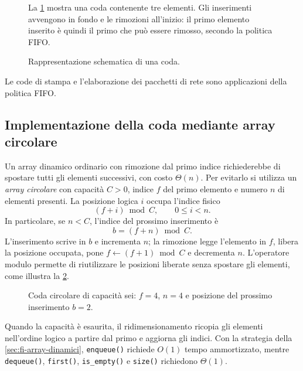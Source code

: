 \begin{figure}[htbp]
  \begin{minipage}[c]{0.54\textwidth}
    La \cref{fig:fi-coda} mostra una coda contenente tre elementi.
    Gli inserimenti avvengono in fondo e le rimozioni all'inizio:
    il primo elemento inserito è quindi il primo che può essere
    rimosso, secondo la politica FIFO.
  \end{minipage}
  \hfill
  \begin{minipage}[c]{0.40\textwidth}
    \centering
    \resizebox{\linewidth}{!}{%
    }
  \end{minipage}
  \caption{Rappresentazione schematica di una coda.}
  \label{fig:fi-coda}
\end{figure}

Le code di stampa e l'elaborazione dei pacchetti di rete sono
applicazioni della politica FIFO.

\subsection{Implementazione della coda mediante array circolare}
\label{sec:fi-coda-circolare}

Un array dinamico ordinario con rimozione dal primo indice
richiederebbe di spostare tutti gli elementi successivi, con
costo \(\Theta(n)\). Per evitarlo si utilizza un
\emph{array circolare} con capacità \(C>0\), indice \(f\) del
primo elemento e numero \(n\) di elementi presenti.
La posizione logica \(i\) occupa l'indice fisico
\[
  (f+i)\bmod C,
  \qquad 0\le i<n.
\]
In particolare, se \(n<C\), l'indice del prossimo inserimento è
\[
  b=(f+n)\bmod C.
\]
L'inserimento scrive in \(b\) e incrementa \(n\); la rimozione
legge l'elemento in \(f\), libera la posizione occupata, pone
\(f\gets(f+1)\bmod C\) e decrementa \(n\). L'operatore modulo
permette di riutilizzare le posizioni liberate senza spostare
gli elementi, come illustra la \cref{fig:fi-coda-circolare}.

\begin{figure}[htbp]
  \centering
  
  \caption{Coda circolare di capacità sei: \(f=4\), \(n=4\)
  e posizione del prossimo inserimento \(b=2\).}
  \label{fig:fi-coda-circolare}
\end{figure}

Quando la capacità è esaurita, il ridimensionamento ricopia
gli elementi nell'ordine logico a partire dal primo e aggiorna
gli indici. Con la strategia della \cref{sec:fi-array-dinamici},
\texttt{enqueue()} richiede \(O(1)\) tempo ammortizzato, mentre
\texttt{dequeue()}, \texttt{first()}, \texttt{is\_empty()}
e \texttt{size()} richiedono \(\Theta(1)\).

